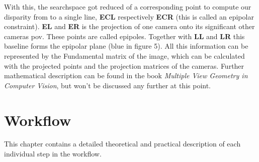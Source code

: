 \documentclass[journal,onecolumn]{IEEEtran}
\begin{document}
With this, the searchspace got reduced of a corresponding point to compute our disparity from to a single line, {\bf ECL} respectively {\bf ECR} (this is called an epipolar constraint). {\bf EL} and {\bf ER} is the projection of one camera onto its significant other cameras pov. These points are called epipoles. Together with {\bf LL} and {\bf LR} this baseline forms the epipolar plane (blue in figure 5). All this information can be represented by the Fundamental matrix of the image, which can be calculated with the projected points and the projection matrices of the cameras. Further mathematical description can be found in the book \emph{Multiple View Geometry in Computer Vision}\cite{hartley_zisserman_2004}, but won't be discussed any further at this point.
\section{Workflow}
\noindent
This chapter contains a detailed theoretical and practical description of each individual step in the workflow.
\end{document}
